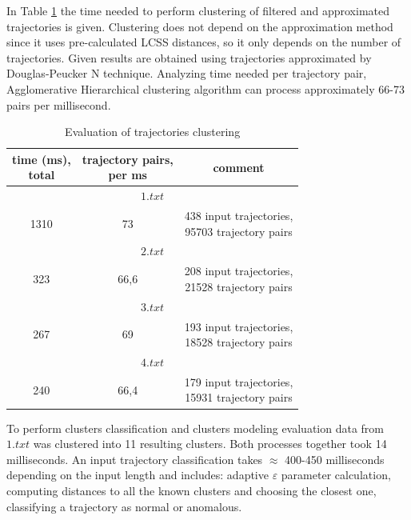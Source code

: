 In Table \ref{table:clust_time} the time needed to perform clustering of filtered and approximated trajectories is given. Clustering does not depend on the approximation method since it uses pre-calculated LCSS distances, so it only depends on the number of trajectories. Given results are obtained using trajectories approximated by Douglas-Peucker N technique. Analyzing time needed per trajectory pair, Agglomerative Hierarchical clustering algorithm can process approximately 66-73 pairs per millisecond.

\begin{table}[!htb]
	\caption{Evaluation of trajectories clustering}
	\label{table:clust_time}
	
	\setlength{\tabcolsep}{10pt}
	\centering
	\setcellgapes{3pt}\makegapedcells
	
	\begin{tabular}{||c|c|c||}
		\hline
		\makecell{time (ms),\\total} & \makecell{trajectory pairs,\\per ms} & comment \\[0.5ex]

		\hline
		\multicolumn{3}{||c||}{$1.txt$} \\[0.5ex]
		\hline
		1310 	& 73	& \makecell{438 input trajectories,\\95703 trajectory pairs} \\[0.5ex]

		\hline
		\multicolumn{3}{||c||}{$2.txt$} \\[0.5ex]
		\hline
		323 	& 66,6	& \makecell{208 input trajectories,\\21528 trajectory pairs} \\[0.5ex]

		\hline
		\multicolumn{3}{||c||}{$3.txt$} \\[0.5ex]
		\hline
		267 	& 69	& \makecell{193 input trajectories,\\18528 trajectory pairs} \\[0.5ex]

		\hline
		\multicolumn{3}{||c||}{$4.txt$} \\[0.5ex]
		\hline
		240 	& 66,4	& \makecell{179 input trajectories,\\15931 trajectory pairs} \\[0.5ex]
	
		\hline
	\end{tabular}
\end{table}

To perform clusters classification and clusters modeling evaluation data from $1.txt$ was clustered into 11 resulting clusters. Both processes together took 14 milliseconds. An input trajectory classification takes $\approx$ 400-450 milliseconds depending on the input length and includes: adaptive $\varepsilon$ parameter calculation, computing distances to all the known clusters and choosing the closest one, classifying a trajectory as normal or anomalous.
